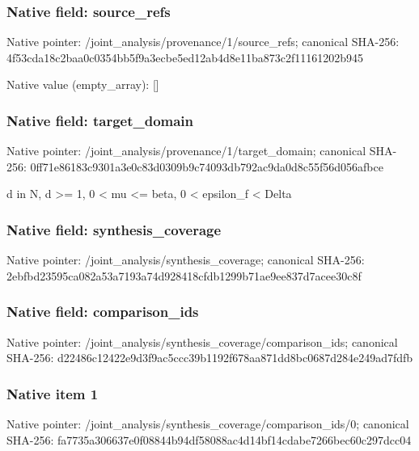 \documentclass[10pt,a4paper]{article}
\begin{document}
\subsubsection{Native field: source\_\allowbreak{}refs}
Native pointer: /joint\_\allowbreak{}analysis/provenance/1/source\_\allowbreak{}refs; canonical SHA-256: 4f53cda18c2baa0c0354bb5f9a3ecbe5ed12ab4d8e11ba873c2f11161202b945

Native value (empty\_\allowbreak{}array): []

\subsubsection{Native field: target\_\allowbreak{}domain}
Native pointer: /joint\_\allowbreak{}analysis/provenance/1/target\_\allowbreak{}domain; canonical SHA-256: 0ff71e86183c9301a3e0c83d0309b9c74093db792ac9da0d8c55f56d056afbce

\begingroup\raggedright\sloppy d in N,\allowbreak{} d >=\allowbreak{} 1,\allowbreak{} 0 < mu <=\allowbreak{} beta,\allowbreak{} 0 < epsilon\_\allowbreak{}f < Delta\par\endgroup

\subsubsection{Native field: synthesis\_\allowbreak{}coverage}
Native pointer: /joint\_\allowbreak{}analysis/synthesis\_\allowbreak{}coverage; canonical SHA-256: 2ebfbd23595ca082a53a7193a74d928418cfdb1299b71ae9ee837d7acee30c8f

\subsubsection{Native field: comparison\_\allowbreak{}ids}
Native pointer: /joint\_\allowbreak{}analysis/synthesis\_\allowbreak{}coverage/comparison\_\allowbreak{}ids; canonical SHA-256: d22486c12422e9d3f9ac5ccc39b1192f678aa871dd8bc0687d284e249ad7fdfb

\subsubsection{Native item 1}
Native pointer: /joint\_\allowbreak{}analysis/synthesis\_\allowbreak{}coverage/comparison\_\allowbreak{}ids/0; canonical SHA-256: fa7735a306637e0f08844b94df58088ac4d14bf14cdabe7266bec60c297dcc04
\end{document}
